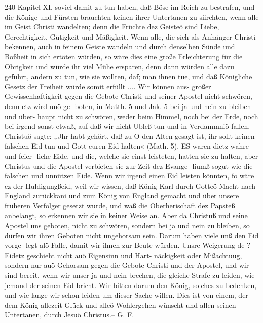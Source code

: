 240 Kapitel XI.
soviel damit zu tun haben, daß Böse im Reich zu bestrafen, und
die Könige und Fürsten brauchten keinen ihrer Untertanen zu
siirchten, wenn alle im Geist Christi wandelten; denn die Früchte
dez Geisteö sind Liebe, Gerechtigkeit, Gütigkeit und Mäßigkeit.
Wenn alle, die sich als Anhänger Christi bekennen, auch in feinem
Geiste wandeln und durch denselben Sünde und Boßheit in sich
ertöten würden, so wäre dies eine große Erleichterung für die
Obrigkeit und würde ihr viel Mühe ersparen, denn dann würden
alle dazu geführt, andern zu tun, wie sie wollten, daf; man ihnen
tue, und daß Königliche Gesetz der Freiheit würde somit erfüllt ....
Wir können aus- großer Gewissenhaftigkeit gegen die Gebote
Christi und seiner Apostel nicht schwören, denn etz wird unö ge-
boten, in Matth. 5 und Jak. 5 bei ja und nein zu bleiben und über-
haupt nicht zu schwören, weder beim Himmel, noch bei der Erde,
noch bei irgend sonst etwaß, auf daß wir nicht Ubleß tun und in
Verdammniö fallen. Christuö sagte: ,,Jhr habt gehört, daß zu O
den Alten gesagt ist, ihr sollt keinen falschen Eid tun und Gott
euren Eid halten« (Math. 5). ES waren dietz wahre und feier-
liche Eide, und die, welche sie einst leisteten, hatten sie zu halten,
aber Christus und die Apostel verbieten sie zur Zeit dez Evange-
liumß sogut wie die falschen und unnützen Eide. Wenn wir irgend
einen Eid leisten könnten, fo wäre ez der Huldigungßeid, weil
wir wissen, daß König Karl durch Gotteö Macht nach England
zurückkani und zum König von England gemacht und über unsere
früheren Verfolger gesetzt wurde, und waß die Oberherischaft dez
Papsteß anbelangt, so erkennen wir sie in keiner Weise an. Aber
da Christuß und seine Apostel uns geboten, nicht zu schwören,
sondern bei ja und nein zu bleiben, so dürfen wir ihren Geboten
nicht ungehorsam sein. Darum haben viele unß den Eid vorge-
legt alö Falle, damit wir ihnen zur Beute würden. Unsre
Weigerung de-? Eidetz geschieht nicht auö Eigensinn und Hart-
näckigkeit oder Mißachtuug, sondern nur auö Gehorsam gegen
die Gebote Christi und der Apostel, und wir sind bereit, wenn wir
unser ja und nein brechen, die gleiche Strafe zu leiden, wie jemand
der seinen Eid bricht. Wir bitten darum den König, solches zu
bedenken, und wie lange wir schon leiden um dieser Sache willen.
Dies ist von einem, der dem König allezeit Glück und alleö
Wohlergehen wünscht und allen seinen Untertanen, durch Jesuö
Christus.-- G. F.


